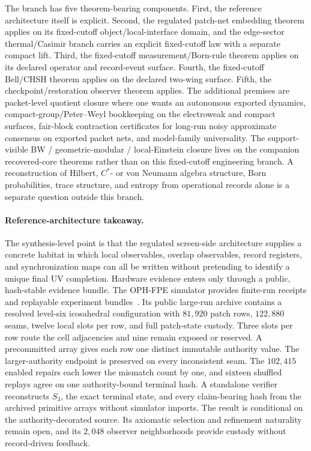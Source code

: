 The branch has five theorem-bearing components. First, the reference architecture itself is
explicit. Second, the regulated patch-net embedding theorem applies on its fixed-cutoff
object/local-interface domain, and the edge-sector thermal/Casimir branch carries an explicit
fixed-cutoff law with a separate compact lift.
Third, the fixed-cutoff measurement/Born-rule theorem applies on its declared operator and
record-event surface. Fourth, the fixed-cutoff
Bell/CHSH theorem applies on the declared two-wing surface. Fifth, the
checkpoint/restoration observer theorem applies. The additional premises are
packet-level quotient closure where one wants an autonomous exported dynamics,
compact-group/Peter--Weyl bookkeeping on the electroweak and compact surfaces, fair-block contraction
certificates for long-run noisy approximate consensus on exported packet nets, and model-family
universality. The
support-visible BW / geometric-modular / local-Einstein closure lives on the companion recovered-core
theorems rather than on this fixed-cutoff engineering branch. A reconstruction of Hilbert, \(C^*\)- or von Neumann algebra
structure, Born probabilities, trace structure, and entropy from operational records alone is
a separate question outside this branch.

\paragraph{Reference-architecture takeaway.}
The synthesis-level point is that the regulated screen-side architecture supplies a concrete
habitat in which local observables, overlap observables, record registers, and synchronization
maps can all be written without pretending to identify a unique final UV completion. Hardware
evidence enters only through a public, hash-stable evidence bundle.
The OPH-FPE simulator provides finite-run receipts and replayable experiment
bundles~\cite{ophfpe}. Its public large-run archive contains a resolved
level-six icosahedral configuration with \(81{,}920\) patch rows,
\(122{,}880\) seams, twelve local slots per row, and full patch-state custody.
Three slots per row route the cell adjacencies and nine remain exposed or
reserved. A precommitted array gives each row one distinct immutable authority
value. The larger-authority endpoint is preserved on every inconsistent seam.
The \(102{,}415\) enabled repairs each lower the mismatch count by one, and
sixteen shuffled replays agree on one authority-bound terminal hash. A
standalone verifier reconstructs \(S_3\), the exact terminal state, and every
claim-bearing hash from the archived primitive arrays without simulator
imports. The result is conditional on the authority-decorated source. Its
axiomatic selection and refinement naturality remain open, and its
\(2{,}048\) observer neighborhoods provide custody without record-driven
feedback.

